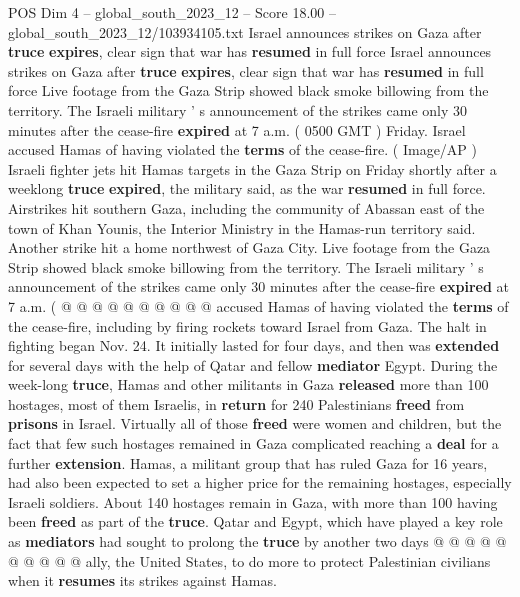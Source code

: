 \begin{textsample}{POS Dim 4 – global\_south\_2023\_12 – Score 18.00 – global\_south\_2023\_12/103934105.txt}  \label{ex:f4_pos_135}
Israel announces strikes on Gaza after \textbf{truce} \textbf{expires}, clear sign that war has \textbf{resumed} in full force Israel announces strikes on Gaza after \textbf{truce} \textbf{expires}, clear sign that war has \textbf{resumed} in full force Live footage from the Gaza Strip showed black smoke billowing from the territory.
The Israeli military ' s announcement of the strikes came only 30 minutes after the cease-fire \textbf{expired} at 7 a.m. ( 0500 GMT ) Friday.
Israel accused Hamas of having violated the \textbf{terms} of the cease-fire. ( Image/AP ) Israeli fighter jets hit Hamas targets in the Gaza Strip on Friday shortly after a weeklong \textbf{truce} \textbf{expired}, the military said, as the war \textbf{resumed} in full force.
Airstrikes hit southern Gaza, including the community of Abassan east of the town of Khan Younis, the Interior Ministry in the Hamas-run territory said.
Another strike hit a home northwest of Gaza City.
Live footage from the Gaza Strip showed black smoke billowing from the territory.
The Israeli military ' s announcement of the strikes came only 30 minutes after the cease-fire \textbf{expired} at 7 a.m. ( @ @ @ @ @ @ @ @ @ @ accused Hamas of having violated the \textbf{terms} of the cease-fire, including by firing rockets toward Israel from Gaza.
The halt in fighting began Nov. 24.
It initially lasted for four days, and then was \textbf{extended} for several days with the help of Qatar and fellow \textbf{mediator} Egypt.
During the week-long \textbf{truce}, Hamas and other militants in Gaza \textbf{released} more than 100 hostages, most of them Israelis, in \textbf{return} for 240 Palestinians \textbf{freed} from \textbf{prisons} in Israel.
Virtually all of those \textbf{freed} were women and children, but the fact that few such hostages remained in Gaza complicated reaching a \textbf{deal} for a further \textbf{extension}.
Hamas, a militant group that has ruled Gaza for 16 years, had also been expected to set a higher price for the remaining hostages, especially Israeli soldiers.
About 140 hostages remain in Gaza, with more than 100 having been \textbf{freed} as part of the \textbf{truce}.
Qatar and Egypt, which have played a key role as \textbf{mediators} had sought to prolong the \textbf{truce} by another two days @ @ @ @ @ @ @ @ @ @ ally, the United States, to do more to protect Palestinian civilians when it \textbf{resumes} its strikes against Hamas.

\end{textsample}
